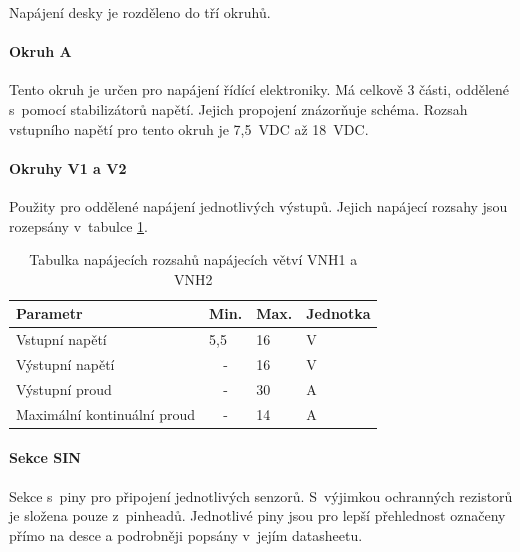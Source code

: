 Napájení desky je rozděleno do tří okruhů. 

\paragraph{Okruh A}
\label{par:PowerCircuitA}
Tento okruh je určen pro napájení řídící elektroniky.
Má celkově 3 části, oddělené s~pomocí stabilizátorů napětí.
Jejich propojení znázorňuje schéma.
Rozsah vstupního napětí pro tento okruh je 7,5~VDC až 18~VDC.

\paragraph{Okruhy V1 a V2}
Použity pro oddělené napájení jednotlivých výstupů. 
Jejich napájecí rozsahy jsou rozepsány v~tabulce \ref{fig:powerSourceCharsVNH}.

\begin{table}[h]
    \centering
    \begin{tabular}{llll}
        \hline
        \multicolumn{1}{|l|}{\textbf{Parametr}}           & \multicolumn{1}{l|}{\textbf{Min.}} & \multicolumn{1}{l|}{\textbf{Max.}} & \multicolumn{1}{l|}{\textbf{Jednotka}} \\ \hline
        \multicolumn{1}{|l|}{Vstupní napětí}              & \multicolumn{1}{l|}{5,5}           & \multicolumn{1}{l|}{16}            & \multicolumn{1}{l|}{V}                 \\ \hline
        \multicolumn{1}{|l|}{Výstupní napětí}             & \multicolumn{1}{c|}{-}             & \multicolumn{1}{l|}{16}            & \multicolumn{1}{l|}{V}                 \\ \hline
        \multicolumn{1}{|l|}{Výstupní proud}              & \multicolumn{1}{c|}{-}             & \multicolumn{1}{l|}{30}            & \multicolumn{1}{l|}{A}                 \\ \hline
        \multicolumn{1}{|l|}{Maximální kontinuální proud} & \multicolumn{1}{c|}{-}             & \multicolumn{1}{l|}{14}            & \multicolumn{1}{l|}{A}                 \\ \hline
    \end{tabular}
    \caption{Tabulka napájecích rozsahů napájecích větví VNH1 a VNH2}
    \label{fig:powerSourceCharsVNH}
\end{table}

\paragraph{Sekce SIN}
Sekce s~piny pro připojení jednotlivých senzorů. 
S~výjimkou ochranných rezistorů je složena pouze z~pinheadů.
Jednotlivé piny jsou pro lepší přehlednost označeny přímo na desce a podrobněji popsány v~jejím datasheetu. 

